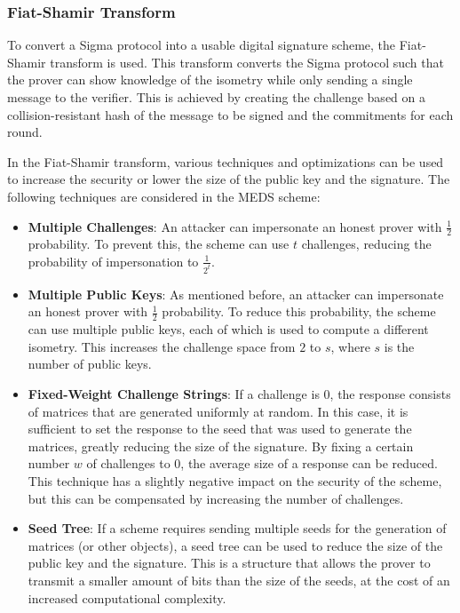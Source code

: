 \documentclass[11pt,a4paper]{report}
\begin{document}
\subsubsection{Fiat-Shamir Transform}
To convert a Sigma protocol into a usable digital signature scheme, the Fiat-Shamir transform \cite{fiat1986prove} is used. This transform converts the Sigma protocol such that the prover can show knowledge of the isometry while only sending a single message to the verifier. This is achieved by creating the challenge based on a collision-resistant hash of the message to be signed and the commitments for each round.

In the Fiat-Shamir transform, various techniques and optimizations can be used to increase the security or lower the size of the public key and the signature. The following techniques are considered in the MEDS scheme:
\begin{itemize}
  \item \textbf{Multiple Challenges}: An attacker can impersonate an honest prover with $\frac{1}{2}$ probability. To prevent this, the scheme can use $t$ challenges, reducing the probability of impersonation to $\frac{1}{2^t}$.
  \item \textbf{Multiple Public Keys}: As mentioned before, an attacker can impersonate an honest prover with $\frac{1}{2}$ probability. To reduce this probability, the scheme can use multiple public keys, each of which is used to compute a different isometry. This increases the challenge space from $2$ to $s$, where $s$ is the number of public keys.
  \item \textbf{Fixed-Weight Challenge Strings}: If a challenge is 0, the response consists of matrices that are generated uniformly at random. In this case, it is sufficient to set the response to the seed that was used to generate the matrices, greatly reducing the size of the signature. By fixing a certain number $w$ of challenges to 0, the average size of a response can be reduced. This technique has a slightly negative impact on the security of the scheme, but this can be compensated by increasing the number of challenges.
  \item \textbf{Seed Tree}: If a scheme requires sending multiple seeds for the generation of matrices (or other objects), a seed tree can be used to reduce the size of the public key and the signature. This is a structure that allows the prover to transmit a smaller amount of bits than the size of the seeds, at the cost of an increased computational complexity.
\end{itemize}
\end{document}

